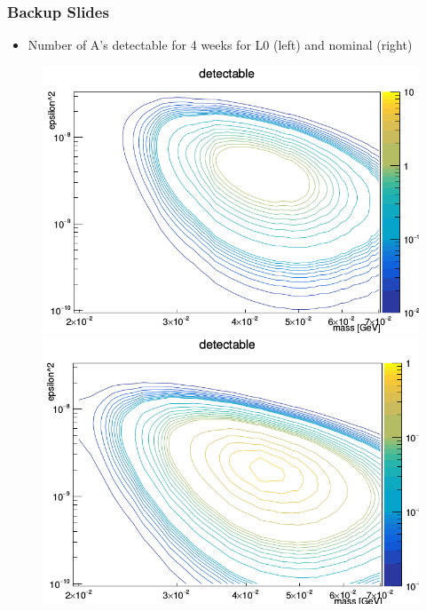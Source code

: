 \documentclass{beamer}
\begin{document}

\begin{frame}
\frametitle{Backup Slides}

\begin{itemize}
\item Number of A's detectable for 4 weeks for L0 (left) and nominal (right)
\end{itemize}

\begin{figure}
\includegraphics[width=0.5\linewidth]{figs/detectable_4_weeks_L0.png}
\includegraphics[width=0.5\linewidth]{figs/detectable_4_weeks_nom.png}
\end{figure}

\end{frame}

\end{document}
